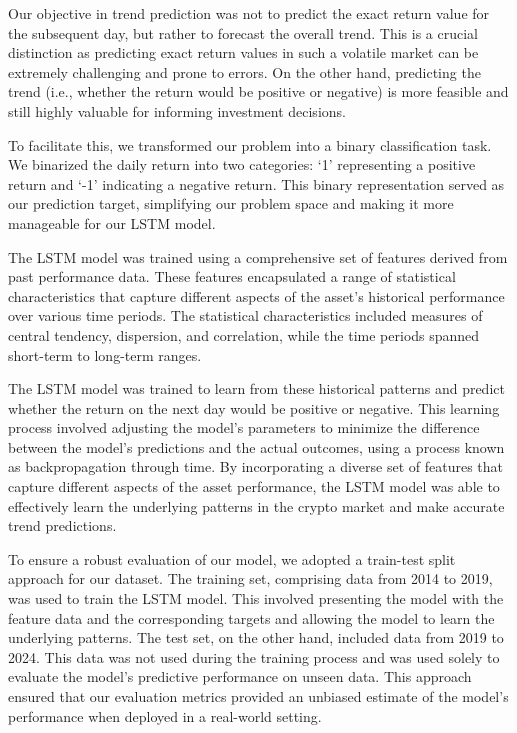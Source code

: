 \documentclass[journal]{IEEEtran}
\begin{document}
Our objective in trend prediction was not to predict the exact return value for the subsequent day, but rather to forecast the overall trend. This is a crucial distinction as predicting exact return values in such a volatile market can be extremely challenging and prone to errors. On the other hand, predicting the trend (i.e., whether the return would be positive or negative) is more feasible and still highly valuable for informing investment decisions.

To facilitate this, we transformed our problem into a binary classification task. We binarized the daily return into two categories: ‘1’ representing a positive return and ‘-1’ indicating a negative return. This binary representation served as our prediction target, simplifying our problem space and making it more manageable for our LSTM model.

The LSTM model was trained using a comprehensive set of features derived from past performance data. These features encapsulated a range of statistical characteristics that capture different aspects of the asset's historical performance over various time periods. The statistical characteristics included measures of central tendency, dispersion, and correlation, while the time periods spanned short-term to long-term ranges. 

The LSTM model was trained to learn from these historical patterns and predict whether the return on the next day would be positive or negative. This learning process involved adjusting the model's parameters to minimize the difference between the model's predictions and the actual outcomes, using a process known as backpropagation through time. By incorporating a diverse set of features that capture different aspects of the asset performance, the LSTM model was able to effectively learn the underlying patterns in the crypto market and make accurate trend predictions.

To ensure a robust evaluation of our model, we adopted a train-test split approach for our dataset. The training set, comprising data from 2014 to 2019, was used to train the LSTM model. This involved presenting the model with the feature data and the corresponding targets and allowing the model to learn the underlying patterns. The test set, on the other hand, included data from 2019 to 2024. This data was not used during the training process and was used solely to evaluate the model’s predictive performance on unseen data. This approach ensured that our evaluation metrics provided an unbiased estimate of the model's performance when deployed in a real-world setting.
\end{document}
